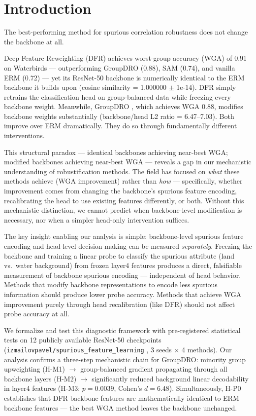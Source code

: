\section{Introduction}
\label{sec:introduction}

The best-performing method for spurious correlation robustness does not change the backbone at all.

Deep Feature Reweighting (DFR) \cite{kirichenko2022last} achieves worst-group accuracy (WGA) of 0.91 on Waterbirds --- outperforming GroupDRO (0.88), SAM (0.74), and vanilla ERM (0.72) --- yet its ResNet-50 backbone is numerically identical to the ERM backbone it builds upon (cosine similarity = 1.000000 $\pm$ 1e-14). DFR simply retrains the classification head on group-balanced data while freezing every backbone weight. Meanwhile, GroupDRO \cite{sagawa2019distributionally}, which achieves WGA 0.88, modifies backbone weights substantially (backbone/head L2 ratio = 6.47--7.03). Both improve over ERM dramatically. They do so through fundamentally different interventions.

This structural paradox --- identical backbones achieving near-best WGA; modified backbones achieving near-best WGA --- reveals a gap in our mechanistic understanding of robustification methods. The field has focused on \emph{what} these methods achieve (WGA improvement) rather than \emph{how} --- specifically, whether improvement comes from changing the backbone's spurious feature encoding, recalibrating the head to use existing features differently, or both. Without this mechanistic distinction, we cannot predict when backbone-level modification is necessary, nor when a simpler head-only intervention suffices.

The key insight enabling our analysis is simple: backbone-level spurious feature encoding and head-level decision making can be measured \emph{separately}. Freezing the backbone and training a linear probe to classify the spurious attribute (land vs.\ water background) from frozen layer4 features produces a direct, falsifiable measurement of backbone spurious encoding --- independent of head behavior. Methods that modify backbone representations to encode less spurious information should produce lower probe accuracy. Methods that achieve WGA improvement purely through head recalibration (like DFR) should not affect probe accuracy at all.

We formalize and test this diagnostic framework with pre-registered statistical tests on 12 publicly available ResNet-50 checkpoints (\texttt{izmailovpavel/spurious\_feature\_learning} \cite{izmailov2022feature}, 3 seeds $\times$ 4 methods). Our analysis confirms a three-step mechanistic chain for GroupDRO: minority group upweighting (H-M1) $\to$ group-balanced gradient propagating through all backbone layers (H-M2) $\to$ significantly reduced background linear decodability in layer4 features (H-M3: $p = 0.0039$, Cohen's $d = 6.48$). Simultaneously, H-P0 establishes that DFR backbone features are mathematically identical to ERM backbone features --- the best WGA method leaves the backbone unchanged.

